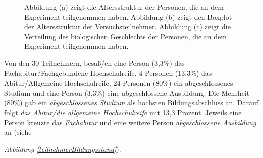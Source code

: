 \documentclass[a4paper,11pt]{article}%
\renewcommand{\\}{\vspace*{0.5\baselineskip} \newline}
\begin{document}
{{{	\begin{figure}[h]
  \centering
  \qquad
  \qquad
  \caption[Altersstruktur, Boxplot des Alters und biologisches Geschlecht der Teilnehmer]{Abbildung (a) zeigt die Altersstruktur der Personen, die an dem Experiment teilgenommen haben. Abbildung (b) zeigt den Boxplot der Altersstruktur der Versuchsteilnehmer. Abbildung (c) zeigt die Verteilung des biologischen Geschlechts der Personen, die an dem Experiment teilgenommen haben.}
  \label{teilnehmer Alter}
\end{figure}

Von den 30 Teilnehmern, besaß/en eine Person (3,3\%) das Fachabitur/Fachgebundene Hochschulreife, 4 Personen (13,3\%) das Abitur/Allgemeine Hochschulreife, 24 Personen (80\%) ein abgeschlossenes Studium und eine Person (3,3\%) eine abgeschlossene Ausbildung. 
Die Mehrheit (80\%)  gab ein \textit{abgeschlossenes Studium} als höchsten Bildungsabschluss an. Darauf folgt \textit{das Abitur/die allgemeine Hochschulreife} mit 13,3 Prozent. Jeweils eine Person kreuzte das \textit{Fachabitur} und eine weitere Person \textit{abgeschlossene Ausbildung} an (siehe {\textit{Abbildung \ref{teilnehmerBildungsstand}}).

}}}}
\end{document}
